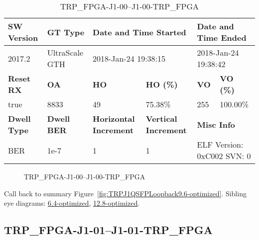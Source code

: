 \begin{table}[h]
\centering
\caption{TRP\_FPGA-J1-00--J1-00-TRP\_FPGA}
\label{tab:TRPFPGAJ100J100TRPFPGA9.6-optimized}
\begin{tabular}{@{}|l|l|l|l|l|l|@{}}
\toprule
\textbf{SW Version}                & \textbf{GT Type}   & \multicolumn{2}{l|}{\textbf{Date and Time Started}}            & \multicolumn{2}{l|}{\textbf{Date and Time Ended}}        \\ \midrule
2017.2                       & UltraScale GTH          & \multicolumn{2}{l|}{2018-Jan-24 19:38:15}                   & \multicolumn{2}{l|}{2018-Jan-24 19:38:42}               \\ \midrule
\textbf{Reset RX}                  & \textbf{OA} & \textbf{HO}   & \textbf{HO (\%)} & \textbf{VO} & \textbf{VO (\%)} \\ \midrule
true & 8833        & 49          & 75.38\%        & 255        & 100.00\%       \\ \midrule
\textbf{Dwell Type}                & \textbf{Dwell BER} & \textbf{Horizontal Increment} & \textbf{Vertical Increment}    & \multicolumn{2}{l|}{\textbf{Misc Info}}                  \\ \midrule
BER                            & 1e-7        & 1        & 1           & \multicolumn{2}{l|}{ELF Version: 0xC002 SVN: 0}                         \\ \bottomrule
\end{tabular}
\end{table}

\begin{figure}[h]
\caption{TRP\_FPGA-J1-00--J1-00-TRP\_FPGA} \label{fig:TRPFPGAJ100J100TRPFPGA9.6-optimized}
\end{figure}

Call back to summary Figure~\ref{fig:TRPJ1QSFPLoopback9.6-optimized}.
Sibling eye diagrams: \hyperref[sec:TRPFPGAJ100J100TRPFPGA6.4-optimized]{6.4-optimized}, \hyperref[sec:TRPFPGAJ100J100TRPFPGA12.8-optimized]{12.8-optimized}.

\clearpage
\newpage


\subsection{TRP\_FPGA-J1-01--J1-01-TRP\_FPGA}\label{sec:TRPFPGAJ101J101TRPFPGA9.6-optimized}

